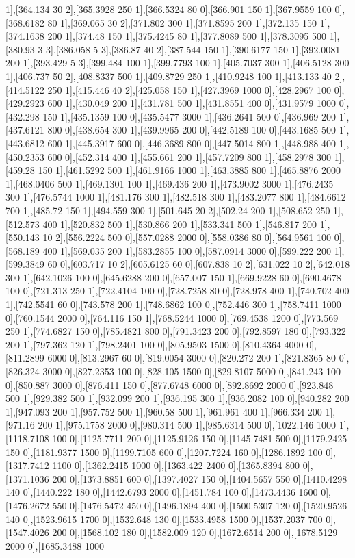 {1],[364.134 30 2],[365.3928 250 1],[366.5324 80 0],[366.901 150 1],[367.9559 100 0],[368.6182 80 1],[369.065 30 2],[371.802 300 1],[371.8595 200 1],[372.135 150 1],[374.1638 200 1],[374.48 150 1],[375.4245 80 1],[377.8089 500 1],[378.3095 500 1],[380.93 3 3],[386.058 5 3],[386.87 40 2],[387.544 150 1],[390.6177 150 1],[392.0081 200 1],[393.429 5 3],[399.484 100 1],[399.7793 100 1],[405.7037 300 1],[406.5128 300 1],[406.737 50 2],[408.8337 500 1],[409.8729 250 1],[410.9248 100 1],[413.133 40 2],[414.5122 250 1],[415.446 40 2],[425.058 150 1],[427.3969 1000 0],[428.2967 100 0],[429.2923 600 1],[430.049 200 1],[431.781 500 1],[431.8551 400 0],[431.9579 1000 0],[432.298 150 1],[435.1359 100 0],[435.5477 3000 1],[436.2641 500 0],[436.969 200 1],[437.6121 800 0],[438.654 300 1],[439.9965 200 0],[442.5189 100 0],[443.1685 500 1],[443.6812 600 1],[445.3917 600 0],[446.3689 800 0],[447.5014 800 1],[448.988 400 1],[450.2353 600 0],[452.314 400 1],[455.661 200 1],[457.7209 800 1],[458.2978 300 1],[459.28 150 1],[461.5292 500 1],[461.9166 1000 1],[463.3885 800 1],[465.8876 2000 1],[468.0406 500 1],[469.1301 100 1],[469.436 200 1],[473.9002 3000 1],[476.2435 300 1],[476.5744 1000 1],[481.176 300 1],[482.518 300 1],[483.2077 800 1],[484.6612 700 1],[485.72 150 1],[494.559 300 1],[501.645 20 2],[502.24 200 1],[508.652 250 1],[512.573 400 1],[520.832 500 1],[530.866 200 1],[533.341 500 1],[546.817 200 1],[550.143 10 2],[556.2224 500 0],[557.0288 2000 0],[558.0386 80 0],[564.9561 100 0],[568.189 400 1],[569.035 200 1],[583.2855 100 0],[587.0914 3000 0],[599.222 200 1],[599.3849 60 0],[603.717 10 2],[605.6125 60 0],[607.838 10 2],[631.022 10 2],[642.018 300 1],[642.1026 100 0],[645.6288 200 0],[657.007 150 1],[669.9228 60 0],[690.4678 100 0],[721.313 250 1],[722.4104 100 0],[728.7258 80 0],[728.978 400 1],[740.702 400 1],[742.5541 60 0],[743.578 200 1],[748.6862 100 0],[752.446 300 1],[758.7411 1000 0],[760.1544 2000 0],[764.116 150 1],[768.5244 1000 0],[769.4538 1200 0],[773.569 250 1],[774.6827 150 0],[785.4821 800 0],[791.3423 200 0],[792.8597 180 0],[793.322 200 1],[797.362 120 1],[798.2401 100 0],[805.9503 1500 0],[810.4364 4000 0],[811.2899 6000 0],[813.2967 60 0],[819.0054 3000 0],[820.272 200 1],[821.8365 80 0],[826.324 3000 0],[827.2353 100 0],[828.105 1500 0],[829.8107 5000 0],[841.243 100 0],[850.887 3000 0],[876.411 150 0],[877.6748 6000 0],[892.8692 2000 0],[923.848 500 1],[929.382 500 1],[932.099 200 1],[936.195 300 1],[936.2082 100 0],[940.282 200 1],[947.093 200 1],[957.752 500 1],[960.58 500 1],[961.961 400 1],[966.334 200 1],[971.16 200 1],[975.1758 2000 0],[980.314 500 1],[985.6314 500 0],[1022.146 1000 1],[1118.7108 100 0],[1125.7711 200 0],[1125.9126 150 0],[1145.7481 500 0],[1179.2425 150 0],[1181.9377 1500 0],[1199.7105 600 0],[1207.7224 160 0],[1286.1892 100 0],[1317.7412 1100 0],[1362.2415 1000 0],[1363.422 2400 0],[1365.8394 800 0],[1371.1036 200 0],[1373.8851 600 0],[1397.4027 150 0],[1404.5657 550 0],[1410.4298 140 0],[1440.222 180 0],[1442.6793 2000 0],[1451.784 100 0],[1473.4436 1600 0],[1476.2672 550 0],[1476.5472 450 0],[1496.1894 400 0],[1500.5307 120 0],[1520.9526 140 0],[1523.9615 1700 0],[1532.648 130 0],[1533.4958 1500 0],[1537.2037 700 0],[1547.4026 200 0],[1568.102 180 0],[1582.009 120 0],[1672.6514 200 0],[1678.5129 2000 0],[1685.3488 1000 }
